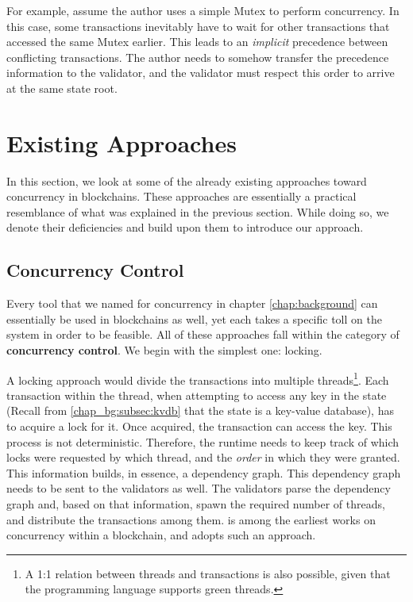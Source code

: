 For example, assume the author uses a simple Mutex to perform concurrency. In this case, some
transactions inevitably have to wait for other transactions that accessed the same Mutex earlier.
This leads to an \textit{implicit} precedence between conflicting transactions. The author needs to
somehow transfer the precedence information to the validator, and the validator must respect this
order to arrive at the same state root.

\section{Existing Approaches}\label{chap_approach:existing}

In this section, we look at some of the already existing approaches toward concurrency in
blockchains. These approaches are essentially a practical resemblance of what was explained in the
previous section. While doing so, we denote their deficiencies and build upon them to introduce our
approach.

\subsection*{Concurrency Control}

Every tool that we named for concurrency in chapter \ref{chap:background} can essentially be used in
blockchains as well, yet each takes a specific toll on the system in order to be feasible. All of
these approaches fall within the category of \textbf{concurrency control}. We begin with the
simplest one: locking.

A locking approach would divide the transactions into multiple threads\footnote{A 1:1 relation
between threads and transactions is also possible, given that the programming language supports
green threads.}. Each transaction within the thread, when attempting to access any key in the state
(Recall from \ref{chap_bg:subsec:kvdb} that the state is a key-value database), has to acquire a
lock for it. Once acquired, the transaction can access the key. This process is not deterministic.
Therefore, the runtime needs to keep track of which locks were requested by which thread, and the
\textit{order} in which they were granted. This information builds, in essence, a dependency graph.
This dependency graph needs to be sent to the validators as well. The validators parse the
dependency graph and, based on that information, spawn the required number of threads, and
distribute the transactions among them. \cite{dickersonSmartLocksAddingConcurrency2017} is among the
earliest works on concurrency within a blockchain, and adopts such an approach.

